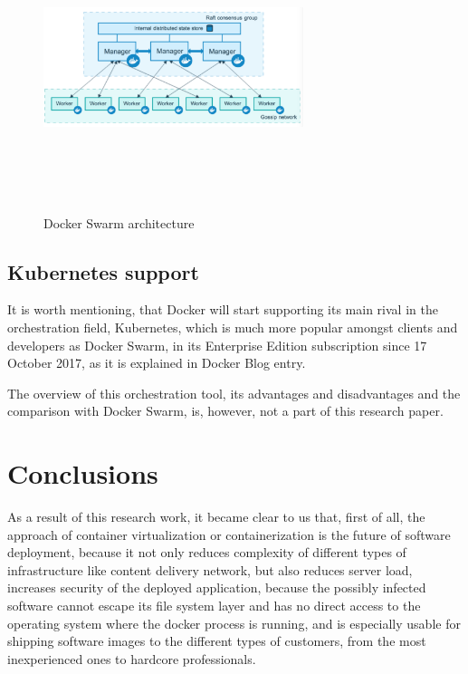 \begin{figure}
\includegraphics[height=3in, width=3in]{DockerSwarm}
\caption{Docker Swarm architecture}
\cite{DockerSwarmPic}
\label{fig:DockerSwarmPic}
\end{figure}

\subsection{Kubernetes support}

It is worth mentioning,
that Docker will start
supporting its main rival in the orchestration field, Kubernetes,
which is much more popular amongst clients and developers as Docker Swarm,
in its Enterprise Edition subscription since 17 October 2017,
as it is explained in Docker Blog entry\cite{DockerKubernetesSupport}.

The overview of this orchestration tool, its advantages and disadvantages
and the comparison with Docker Swarm, is, however, not a part of
this research paper.

\section{Conclusions}

As a result of this research work, it became clear to us that, first of all,
the approach of container virtualization or containerization
is the future of software deployment, because it not only reduces complexity of
different types of infrastructure like content delivery network,
but also reduces server load,
increases security of the deployed application,
because the possibly infected software cannot
escape its file system layer and has no direct access
to the operating system where the docker process is running, and is
especially usable for shipping software
images to the different types of customers,
from the most inexperienced ones to hardcore professionals.

